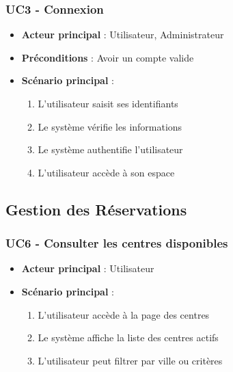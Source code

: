 \documentclass[12pt,a4paper]{article}
\begin{document}
\subsubsection{UC3 - Connexion}
\begin{itemize}
    \item \textbf{Acteur principal} : Utilisateur, Administrateur
    \item \textbf{Préconditions} : Avoir un compte valide
    \item \textbf{Scénario principal} :
    \begin{enumerate}
        \item L'utilisateur saisit ses identifiants
        \item Le système vérifie les informations
        \item Le système authentifie l'utilisateur
        \item L'utilisateur accède à son espace
    \end{enumerate}
\end{itemize}

\subsection{Gestion des Réservations}

\subsubsection{UC6 - Consulter les centres disponibles}
\begin{itemize}
    \item \textbf{Acteur principal} : Utilisateur
    \item \textbf{Scénario principal} :
    \begin{enumerate}
        \item L'utilisateur accède à la page des centres
        \item Le système affiche la liste des centres actifs
        \item L'utilisateur peut filtrer par ville ou critères
    \end{enumerate}
\end{itemize}
\end{document}
